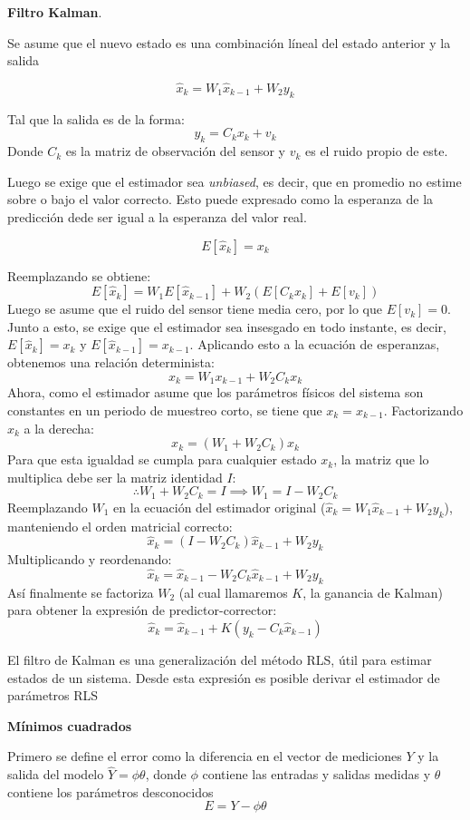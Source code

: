 \textbf{Filtro Kalman}.


Se asume que el nuevo estado es una combinación líneal del estado anterior y la salida

\[
  \hat{x}_k = W_1\hat{x}_{k-1} + W_2y_k
\]

Tal que la salida es de la forma:
\[
  y_k = C_kx_k + v_k
\]
Donde $C_k$ es la matriz de observación del sensor y $v_k$ es el ruido propio de este.


Luego se exige que el estimador sea \textit{unbiased}, es decir, que en promedio no estime sobre o bajo el valor correcto. Esto puede expresado como la esperanza de la predicción dede ser igual a la esperanza del valor real.

\[
  E[\hat{x}_k] = x_k
\]

Reemplazando se obtiene:
\[
  E[\hat{x}_k] = W_1 E[\hat{x}_{k-1}] + W_2(E[C_k x_k] + E[v_k])
\]
Luego se asume que el ruido del sensor tiene media cero, por lo que $E[v_k]=0$. Junto a esto, se exige que el estimador sea insesgado en todo instante, es decir, $E[\hat{x}_k] = x_k$ y $E[\hat{x}_{k-1}] = x_{k-1}$. Aplicando esto a la ecuación de esperanzas, obtenemos una relación determinista:
\[
  x_k = W_1 x_{k-1} + W_2 C_k x_k
\]
Ahora, como el estimador asume que los parámetros físicos del sistema son constantes en un periodo de muestreo corto, se tiene que $x_k = x_{k-1}$. Factorizando $x_k$ a la derecha:
\[
  x_k = (W_1 + W_2 C_k) x_k
\]
Para que esta igualdad se cumpla para cualquier estado $x_k$, la matriz que lo multiplica debe ser la matriz identidad $I$:
\[
 \therefore W_1 + W_2C_k = I \implies W_1 = I - W_2C_k
\]
Reemplazando $W_1$ en la ecuación del estimador original ($\hat{x}_k = W_1\hat{x}_{k-1} + W_2y_k$), manteniendo el orden matricial correcto:
\[
  \hat{x}_k = (I - W_2C_k)\hat{x}_{k-1} + W_2y_k
\]
Multiplicando y reordenando:
\[
  \hat{x}_k = \hat{x}_{k-1} - W_2C_k\hat{x}_{k-1} + W_2y_k
\]
Así finalmente se factoriza $W_2$ (al cual llamaremos $K$, la ganancia de Kalman) para obtener la expresión de predictor-corrector:
\begin{equation}
  \hat{x}_k = \hat{x}_{k-1} + K(y_k - C_k\hat{x}_{k-1})
  \label{kalman}
\end{equation}

El filtro de Kalman es una generalización del método RLS, útil para estimar estados de un sistema. Desde esta expresión es posible derivar el estimador de parámetros RLS

\textbf{Mínimos cuadrados}

Primero se define el error como la diferencia en el vector de mediciones $Y$ y la salida del modelo $\hat{Y} = \phi \theta$, donde $\phi$ contiene las entradas y salidas medidas y $\theta$ contiene los parámetros desconocidos
\[
  E = Y - \phi \theta
\]

